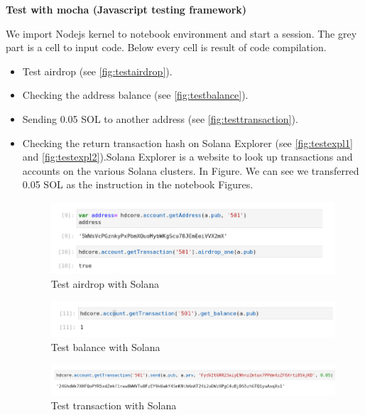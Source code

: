\bigskip
{\textbf{Test with mocha (Javascript testing framework)}}
\bigskip

We import Nodejs kernel to notebook environment and start a session. The grey part is a cell to input code. Below every cell is result of code compilation.

\begin{itemize}
    \item Test airdrop (see \autoref{fig:testairdrop}).
    \item Checking the address balance (see \autoref{fig:testbalance}).
    \item Sending 0.05 SOL to another address (see \autoref{fig:testtransaction}).
    \item Checking the return transaction hash on Solana Explorer (see \autoref{fig:testexpl1} and \autoref{fig:testexpl2}).Solana Explorer is a website to look up transactions and accounts on the various Solana clusters. In Figure. We can see we transferred 0.05 SOL as the instruction in the notebook Figures.

    \begin{figure}[ht!]
        \centering
        \includegraphics[width=1\textwidth]{images/testairdrop.png}
        \caption[Test airdrop with Solana]{Test airdrop with Solana}
        \label{fig:testairdrop}
    \end{figure}
    \begin{figure}[ht!]
        \centering
        \includegraphics[width=1\textwidth]{images/testgetbalance.png}
        \caption[Test balance with Solana]{Test balance with Solana}
        \label{fig:testbalance}
    \end{figure}
    \begin{figure}[ht!]
        \centering
        \includegraphics[width=1\textwidth]{images/testtransaction.png}
        \caption[Test transaction with Solana]{Test transaction with Solana}
        \label{fig:testtransaction}
    \end{figure}


\end{itemize}
